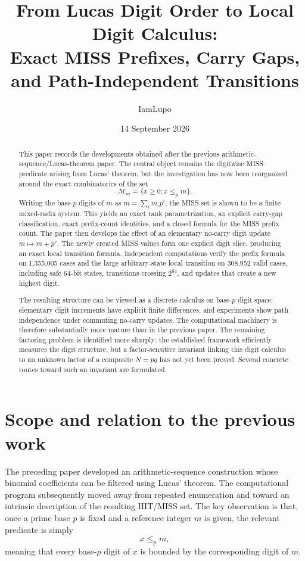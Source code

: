 \documentclass[11pt,a4paper]{article}
\title{From Lucas Digit Order to Local Digit Calculus:\\
Exact MISS Prefixes, Carry Gaps, and Path-Independent Transitions}
\author{IamLupo}
\date{14 September 2026}
\theoremstyle{definition}
\theoremstyle{remark}
\newcommand{\Miss}{\mathcal M}
\newcommand{\ip}{\le_p}
\begin{document}
\maketitle

\begin{abstract}
This paper records the developments obtained after the previous arithmetic-sequence/Lucas-theorem paper.  The central object remains the digitwise MISS predicate arising from Lucas' theorem, but the investigation has now been reorganized around the exact combinatorics of the set
\[
\Miss_m=\{x\ge 0:x\ip m\}.
\]
Writing the base-$p$ digits of $m$ as $m=\sum_i m_i p^i$, the MISS set is shown to be a finite mixed-radix system.  This yields an exact rank parametrization, an explicit carry-gap classification, exact prefix-count identities, and a closed formula for the MISS prefix count.  The paper then develops the effect of an elementary no-carry digit update $m\mapsto m+p^r$.  The newly created MISS values form one explicit digit slice, producing an exact local transition formula.  Independent computations verify the prefix formula on 1,355,005 cases and the large arbitrary-state local transition on 308,952 valid cases, including safe 64-bit states, transitions crossing $2^{64}$, and updates that create a new highest digit.

The resulting structure can be viewed as a discrete calculus on base-$p$ digit space: elementary digit increments have explicit finite differences, and experiments show path independence under commuting no-carry updates.  The computational machinery is therefore substantially more mature than in the previous paper.  The remaining factoring problem is identified more sharply: the established framework efficiently measures the digit structure, but a factor-sensitive invariant linking this digit calculus to an unknown factor of a composite $N=pq$ has not yet been proved.  Several concrete routes toward such an invariant are formulated.
\end{abstract}

\section{Scope and relation to the previous work}

The preceding paper developed an arithmetic-sequence construction whose binomial coefficients can be filtered using Lucas' theorem.  The computational program subsequently moved away from repeated enumeration and toward an intrinsic description of the resulting HIT/MISS set.  The key observation is that, once a prime base $p$ is fixed and a reference integer $m$ is given, the relevant predicate is simply
\[
 x\ip m,
\]
meaning that every base-$p$ digit of $x$ is bounded by the corresponding digit of $m$.
\end{document}
